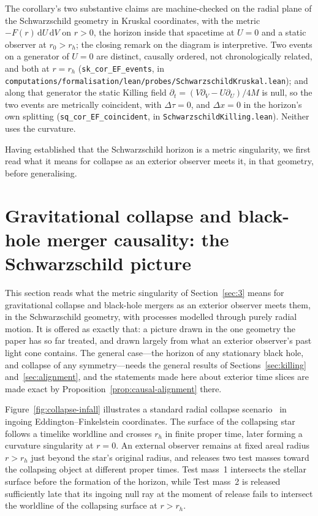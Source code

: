 \documentclass[11pt,a4paper]{article}
\theoremstyle{plain}
\theoremstyle{remark}
\begin{document}
The corollary's two substantive claims are machine-checked on the radial plane of the Schwarzschild geometry in Kruskal coordinates, with the metric $-F(r)\,\mathrm{d}U\,\mathrm{d}V$ on $r>0$, the horizon inside that spacetime at $U=0$ and a static observer at $r_0>r_h$; the closing remark on the diagram is interpretive. Two events on a generator of $U=0$ are distinct, causally ordered, not chronologically related, and both at $r=r_h$ (\texttt{sk\_cor\_EF\_events}, in \texttt{computations/formalisation/lean/probes/SchwarzschildKruskal.lean}); and along that generator the static Killing field $\partial_t=(V\partial_V-U\partial_U)/4M$ is null, so the two events are metrically coincident, with $\Delta\tau=0$, and $\Delta x=0$ in the horizon's own splitting (\texttt{sq\_cor\_EF\_coincident}, in \texttt{SchwarzschildKilling.lean}). Neither uses the curvature.

Having established that the Schwarzschild horizon is a metric singularity, we first read what it means for collapse as an exterior observer meets it, in that geometry, before generalising.

\section{Gravitational collapse and black-hole merger causality: the Schwarzschild picture}\label{sec:application}

This section reads what the metric singularity of Section~\ref{sec:3} means for gravitational collapse and black-hole mergers as an exterior observer meets them, in the Schwarzschild geometry, with processes modelled through purely radial motion. It is offered as exactly that: a picture drawn in the one geometry the paper has so far treated, and drawn largely from what an exterior observer's past light cone contains. The general case---the horizon of any stationary black hole, and collapse of any symmetry---needs the general results of Sections~\ref{sec:killing} and~\ref{sec:alignment}, and the statements made here about exterior time slices are made exact by Proposition~\ref{prop:causal-alignment} there.

Figure~\ref{fig:collapse-infall} illustrates a standard radial collapse scenario~\cite{Oppenheimer1939b,Penrose1965} in ingoing Eddington--Finkelstein coordinates. The surface of the collapsing star follows a timelike worldline and crosses $r_h$ in finite proper time, later forming a curvature singularity at $r=0$. An external observer remains at fixed areal radius $r>r_h$ just beyond the star's original radius, and releases two test masses toward the collapsing object at different proper times. Test mass~1 intersects the stellar surface before the formation of the horizon, while Test mass~2 is released sufficiently late that its ingoing null ray at the moment of release fails to intersect the worldline of the collapsing surface at $r>r_h$.
\end{document}
